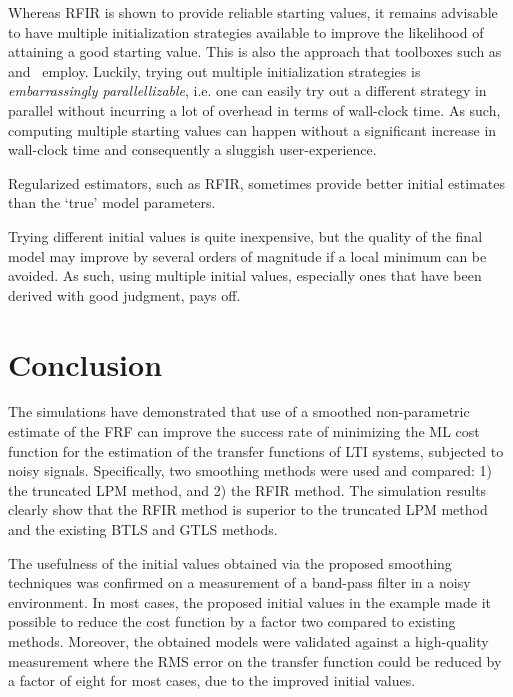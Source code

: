 Whereas \gls{RFIR} is shown to provide reliable starting values, it remains advisable to have multiple initialization strategies available to improve the likelihood of attaining a good starting value.
This is also the approach that toolboxes such as~\citep{FDIDENT} and~\citep{TDIDENT} employ.
Luckily, trying out multiple initialization strategies is \emph{embarrassingly parallellizable}, i.e. one can easily try out a different strategy in parallel without incurring a lot of overhead in terms of wall-clock time.
As such, computing multiple starting values can happen without a significant increase in wall-clock time and consequently a sluggish user-experience.

\begin{guideline}
\label{guide:initvals:try-regularization}
Regularized estimators, such as \gls{RFIR}, sometimes provide better initial estimates than the `true' model parameters.
\end{guideline}

\begin{guideline}
\label{guide:initvals:try-many-initial-values}
Trying different initial values is quite inexpensive, but the quality of the final model may improve by several orders of magnitude if a local minimum can be avoided.
As such, using multiple initial values, especially ones that have been derived with good judgment, pays off.
\end{guideline}

\section{Conclusion}\label{se:Conclusion}
The simulations have demonstrated that use of a smoothed non-parametric estimate of the \gls{FRF} can improve the success rate of minimizing the \gls{ML} cost function for the estimation of the transfer functions of \gls{LTI} systems, subjected to noisy signals. Specifically, two smoothing methods were used and compared: 1) the truncated \gls{LPM} method, and 2) the \gls{RFIR} method. The simulation results clearly show that the \gls{RFIR} method is superior to the truncated \gls{LPM} method and the existing \gls{BTLS} and \gls{GTLS} methods.

The usefulness of the initial values obtained via the proposed smoothing techniques was confirmed on a measurement of a band-pass filter in a noisy environment.
In most cases, the proposed initial values in the example made it possible to reduce the cost function by a factor two compared to existing methods.
Moreover, the obtained models were validated against a high-quality measurement where the \gls{RMS} error on the transfer function could be reduced by a factor of eight for most cases, due to the improved initial values.

